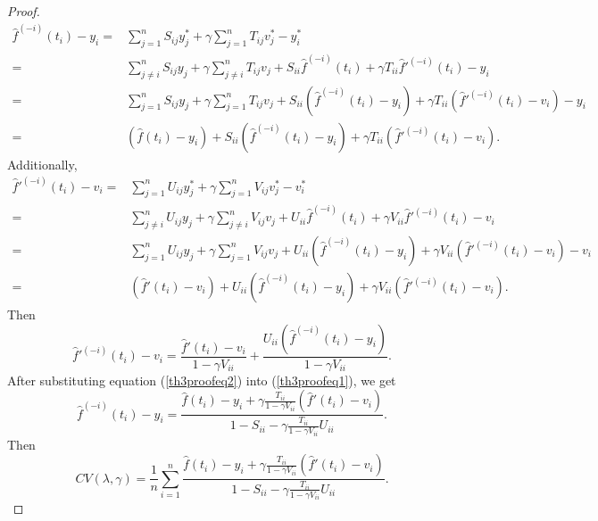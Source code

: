 \begin{proof}
\begin{equation}\label{th3proofeq1}
\begin{split}
\hat{f}^{(-i)}(t_i)-y_i=& \sum_{j=1}^{n}S_{ij}y_j^*+ \gamma \sum_{j=1}^{n}T_{ij}v_j^*-y_i^*\\
=&\sum_{j\neq i}^{n}S_{ij}y_j+ \gamma \sum_{j\neq i}^{n}T_{ij}v_j+S_{ii}\hat{f}^{(-i)}(t_i)+\gamma T_{ii}\hat{f}'^{(-i)}(t_i)-y_i\\
=&\sum_{j=1}^{n}S_{ij}y_j+ \gamma \sum_{j=1}^{n}T_{ij}v_j+S_{ii}(\hat{f}^{(-i)}(t_i)-y_i)+\gamma T_{ii}(\hat{f}'^{(-i)}(t_i)-v_i)-y_i\\
=&(\hat{f}(t_i)-y_i)+S_{ii}(\hat{f}^{(-i)}(t_i)-y_i)+\gamma T_{ii}(\hat{f}'^{(-i)}(t_i)-v_i).
\end{split}
\end{equation}
Additionally, 
\begin{equation}
\begin{split}
\hat{f}'^{(-i)}(t_i)-v_i=& \sum_{j=1}^{n}U_{ij}y_j^*+ \gamma \sum_{j=1}^{n}V_{ij}v_j^*-v_i^*\\
=&\sum_{j\neq i}^{n}U_{ij}y_j+ \gamma \sum_{j\neq i}^{n}V_{ij}v_j+U_{ii}\hat{f}^{(-i)}(t_i)+\gamma V_{ii}\hat{f}'^{(-i)}(t_i)-v_i\\
=&\sum_{j=1}^{n}U_{ij}y_j+ \gamma \sum_{j=1}^{n}V_{ij}v_j+U_{ii}(\hat{f}^{(-i)}(t_i)-y_i)+\gamma V_{ii}(\hat{f}'^{(-i)}(t_i)-v_i)-v_i\\
=&(\hat{f}'(t_i)-v_i)+U_{ii}(\hat{f}^{(-i)}(t_i)-y_i)+\gamma V_{ii}(\hat{f}'^{(-i)}(t_i)-v_i).
\end{split}
\end{equation}
Then
\begin{equation}\label{th3proofeq2}
\hat{f}'^{(-i)}(t_i)-v_i = \frac{\hat{f}'(t_i)-v_i}{1-\gamma V_{ii}}+ \frac{U_{ii}(\hat{f}^{(-i)}(t_i)-y_i)}{1-\gamma V_{ii}}.
\end{equation}
After substituting equation (\ref{th3proofeq2}) into (\ref{th3proofeq1}), we get
\begin{equation}
\hat{f}^{(-i)}(t_i)-y_i=\frac{\hat{f}(t_i)-y_i+\gamma \frac{T_{ii}}{1-\gamma V_{ii}}(\hat{f}'(t_i)-v_i)}{1-S_{ii}-\gamma\frac{T_{ii}}{1-\gamma V_{ii}}U_{ii}}.
\end{equation}
Then
\begin{equation}
CV(\lambda,\gamma)=\frac{1}{n}\sum_{i=1}^{n}\frac{\hat{f}(t_i)-y_i+\gamma \frac{T_{ii}}{1-\gamma V_{ii}}(\hat{f}'(t_i)-v_i)}{1-S_{ii}-\gamma\frac{T_{ii}}{1-\gamma V_{ii}}U_{ii}}.
\end{equation}
\end{proof}
